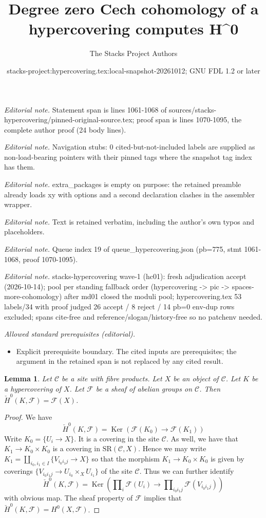 \documentclass[10pt,a4paper]{amsart}
\title{Degree zero Cech cohomology of a hypercovering computes H\textasciicircum{}0}
\author{The Stacks Project Authors}
\date{stacks-project:hypercovering.tex:local-snapshot-20261012; GNU FDL 1.2 or later}
\theoremstyle{plain}
\newtheorem{lemma}[subsection]{Lemma}
\theoremstyle{definition}
\theoremstyle{remark}
\numberwithin{equation}{subsection}
\def\Ker{\mathop{\mathrm{Ker}}}
\begin{document}
\maketitle
\noindent\textit{Editorial note.} Statement span is lines 1061-1068 of sources/stacks-hypercovering/pinned-original-source.tex; proof span is lines 1070-1095, the complete author proof (24 body lines).\par\medskip
\noindent\textit{Editorial note.} Navigation stubs: 0 cited-but-not-included labels are supplied as non-load-bearing pointers with their pinned tags where the snapshot tag index has them.\par\medskip
\noindent\textit{Editorial note.} extra\_packages is empty on purpose: the retained preamble already loads xy with options and a second declaration clashes in the assembler wrapper.\par\medskip
\noindent\textit{Editorial note.} Text is retained verbatim, including the author's own typos and placeholders.\par\medskip
\noindent\textit{Editorial note.} Queue index 19 of queue\_hypercovering.json (pb=775, stmt 1061-1068, proof 1070-1095).\par\medskip
\noindent\textit{Editorial note.} stacks-hypercovering wave-1 (hc01): fresh adjudication accept (2026-10-14); pool per standing fallback order (hypercovering -> pic -> spaces-more-cohomology) after md01 closed the moduli pool; hypercovering.tex 53 labels/34 with proof judged 26 accept / 8 reject / 14 pb=0 env-dup rows excluded; spans cite-free and reference/slogan/history-free so no patchenv needed.\par\medskip
\noindent\textit{Allowed standard prerequisites (editorial).}\begin{itemize}
\item Explicit prerequisite boundary. The cited inputs are prerequisites; the argument in the retained span is not replaced by any cited result.
\end{itemize}\medskip
\begin{lemma}
\label{lemma-h0-cech}
Let $\mathcal{C}$ be a site with fibre products.
Let $X$ be an object of $\mathcal{C}$.
Let $K$ be a hypercovering of $X$.
Let $\mathcal{F}$ be a sheaf of abelian groups on $\mathcal{C}$.
Then $\check{H}^0(K, \mathcal{F}) = \mathcal{F}(X)$.
\end{lemma}

\begin{proof}
We have
$$
\check{H}^0(K, \mathcal{F})
=
\Ker(\mathcal{F}(K_0) \longrightarrow \mathcal{F}(K_1))
$$
Write $K_0 = \{U_i \to X\}$. It is a covering in the site
$\mathcal{C}$. As well, we have that $K_1 \to K_0 \times K_0$
is a covering in $\text{SR}(\mathcal{C}, X)$. Hence we may
write $K_1 = \amalg_{i_0, i_1 \in I} \{V_{i_0i_1j} \to X\}$
so that the morphism $K_1 \to K_0 \times K_0$ is given
by coverings $\{V_{i_0i_1j} \to U_{i_0} \times_X U_{i_1}\}$
of the site $\mathcal{C}$. Thus we can further identify
$$
\check{H}^0(K, \mathcal{F})
=
\Ker(
\prod\nolimits_i \mathcal{F}(U_i)
\longrightarrow
\prod\nolimits_{i_0i_1 j} \mathcal{F}(V_{i_0i_1j})
)
$$
with obvious map. The sheaf property of $\mathcal{F}$
implies that $\check{H}^0(K, \mathcal{F}) = H^0(X, \mathcal{F})$.
\end{proof}
\end{document}
